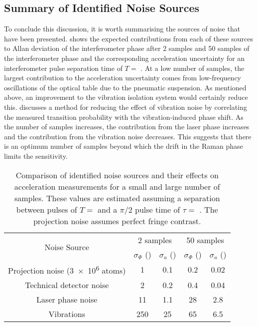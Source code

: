 \subsection{Summary of Identified Noise Sources}\label{subsec:noise_sources}
To conclude this discussion, it is worth summarising the
sources of noise that have been presented. 
 shows the expected contributions from
each of these sources to Allan deviation of the interferometer phase after 2 samples and 50
samples of the
interferometer phase and the corresponding acceleration uncertainty
for an interferometer pulse separation time of $T =$
. At a low number of samples, the largest
contribution to the acceleration uncertainty comes from low-frequency
oscillations of the optical table due to the pneumatic suspension. As mentioned above, an improvement to the
vibration isolation system would certainly reduce this.
 discusses a method for
reducing the effect of vibration noise by correlating the measured
transition probability with the vibration-induced phase shift. As the
number of samples increases, the contribution from the laser phase
increases and the contribution from the vibration noise decreases.
This suggests that there is an optimum number of samples beyond which
the drift in the Raman phase limits the sensitivity.  
\begin{table}[htpb!]
  \centering
  \begin{tabular}{ccccc}
    \toprule
    \multirow{2}{}{Noise Source}  & \multicolumn{2}{c}{2 samples} &
    \multicolumn{2}{c}{50 samples} \\
                                  & $\sigma_{\Phi}$  (\sivalue{}{\milli\radian})  &\(\sigma_a\)
    (\sivalue{}{\micro\meter\per\s\squared}) &
    $\sigma_{\Phi}$  (\sivalue{}{\milli\radian})&\(\sigma_a\)
    (\sivalue{}{\micro\meter\per\s\squared})\\
    \midrule
    Projection noise (\num{3e6} atoms) & 1 & 0.1 & 0.2& 0.02 \\
    Technical detector noise & 2 & 0.2 & 0.4 & 0.04\\
    Laser phase noise  & 11 & 1.1 & 28 & 2.8\\
    Vibrations & 250 & 25 & 65 & 6.5\\
    \bottomrule
  \end{tabular}
  \caption[Comparison of known noise sources.]{Comparison of
    identified noise sources and their effects on
  acceleration measurements for a small and large number of samples. These values are estimated assuming a
separation between pulses of \(T = \)  and a \(\pi/2\)
pulse time of \(\tau = \) . The projection noise
assumes perfect fringe contrast.}
  \label{tab:noise_sources}
\end{table}

